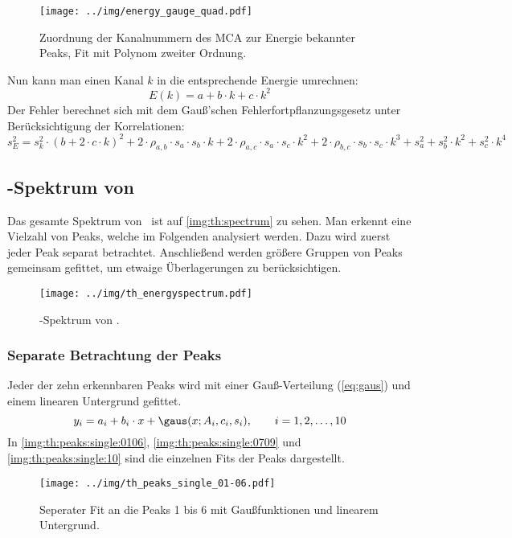 \begin{figure}[H]
\begin{center}
  \texttt{[image: ../img/energy\_gauge\_quad.pdf]}
  \caption{Zuordnung der Kanalnummern des MCA zur Energie bekannter Peaks,
  Fit mit Polynom zweiter Ordnung.}
  \label{img:gauge:quad}
\end{center}
\end{figure}
Nun kann man einen Kanal $k$ in die entsprechende Energie umrechnen:
\begin{equation}
  \label{eq:energygauge}
  E(k) = a + b \cdot k + c \cdot k^2
\end{equation}
Der Fehler berechnet sich mit dem Gauß'schen Fehlerfortpflanzungsgesetz unter Berücksichtigung der Korrelationen:
\begin{equation}
	\label{eq:energygauge:error}
  s_E^2 = s_{k}^2 \cdot (b + 2 \cdot c \cdot k)^2 + 2 \cdot \rho_{a, b} \cdot s_{a} \cdot s_{b} \cdot k + 2 \cdot \rho_{a, c} \cdot s_{a} \cdot s_{c} \cdot k^2 +
  2 \cdot \rho_{b, c} \cdot s_{b} \cdot s_{c} \cdot k^3 + s_{a}^2 + s_{b}^2 \cdot k^2 + s_{c}^2 \cdot k^4
\end{equation}

\subsection{\textgamma-Spektrum von \th}
Das gesamte Spektrum von \th\, ist auf \autoref{img:th:spectrum} zu sehen. Man erkennt eine Vielzahl von Peaks, 
welche im Folgenden analysiert werden. Dazu wird zuerst jeder Peak separat betrachtet. Anschließend werden 
größere Gruppen von Peaks gemeinsam gefittet, um etwaige Überlagerungen zu berücksichtigen.

\begin{figure}[H]
\begin{center}
  \texttt{[image: ../img/th\_energyspectrum.pdf]}
  \caption{\textgamma-Spektrum von \th.}
  \label{img:th:spectrum}
\end{center}
\end{figure}

\subsubsection{Separate Betrachtung der Peaks}
Jeder der zehn erkennbaren Peaks wird mit einer Gauß-Verteilung (\autoref{eq:gaus}) und einem linearen Untergrund gefittet.
\begin{equation}
  y_i = a_i + b_i \cdot x + \gaus(x; A_i, c_i, s_i), \qquad i=1, 2, \ldots, 10
\end{equation}
In \autoref{img:th:peaks:single:0106}, \autoref{img:th:peaks:single:0709} und \autoref{img:th:peaks:single:10} sind die einzelnen Fits der Peaks 
dargestellt.
\begin{figure}[H]
\begin{center}
  \texttt{[image: ../img/th\_peaks\_single\_01-06.pdf]}
  \caption{Seperater Fit an die Peaks 1 bis 6 mit Gaußfunktionen und linearem Untergrund.}
  \label{img:th:peaks:single:0106}
\end{center}
\end{figure}

